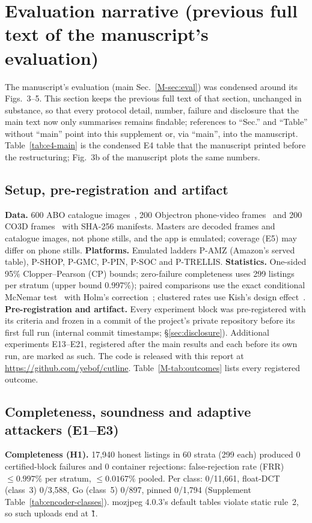 \documentclass[10pt]{article}
\newcommand{\mainref}[1]{\ref{M-#1}}
\newcommand{\repo}{\url{https://github.com/yebof/cutline}}
\begin{document}
\section{Evaluation narrative (previous full text of the manuscript's evaluation)}
\label{sec:evalnarrative}
The manuscript's evaluation (main Sec.~\mainref{sec:eval}) was condensed around its Figs.~3--5. This section keeps
the previous full text of that section, unchanged in substance, so that every protocol detail, number, failure and
disclosure that the main text now only summarises remains findable; references to ``Sec.'' and ``Table'' without
``main'' point into this supplement or, via ``main'', into the manuscript. Table~\ref{tab:e4-main} is the condensed E4
table that the manuscript printed before the restructuring; Fig.~3b of the manuscript plots the same numbers.


\subsection{Setup, pre-registration and artifact}
\textbf{Data.} 600 ABO catalogue images~\cite{collins2022abo}, 200 Objectron phone-video frames~\cite{ahmadyan2021objectron}
and 200 CO3D frames~\cite{reizenstein2021common} with SHA-256 manifests. Masters are decoded frames and catalogue images, not
phone stills, and the app is emulated; coverage (E5) may differ on phone stills.
\textbf{Platforms.} Emulated ladders P-AMZ (Amazon's served table), P-SHOP, P-GMC, P-PIN, P-SOC and P-TRELLIS.
\textbf{Statistics.} One-sided 95\% Clopper--Pearson (CP) bounds; zero-failure completeness uses 299 listings per
stratum (upper bound 0.997\%); paired comparisons use the exact conditional McNemar test~\cite{fagerland2013mcnemar}
with Holm's correction~\cite{aickin1996adjusting}; clustered rates use Kish's design effect~\cite{kish2005design}.
\textbf{Pre-registration and artifact.} Every experiment block was pre-registered with its criteria and frozen in a commit
of the project's private repository before its first full run (internal commit timestamps; \S\ref{sec:disclosure}). Additional experiments E13--E21, registered after the main results and each before its own run, are marked as
such. The code is released with this report at \repo{}. Table~\mainref{tab:outcomes} lists every registered outcome.


\subsection{Completeness, soundness and adaptive attackers (E1--E3)}
\textbf{Completeness (H1).} 17,940 honest listings in 60 strata (299 each) produced 0 certified-block failures and 0
container rejections: false-rejection rate (FRR) $\le0.997\%$ per stratum, $\le0.0167\%$ pooled. Per class:
\Ezero{} 0/11,661, float-DCT (class~3) 0/3,588, Go (class~5) 0/897, pinned \EP{} 0/1,794 (Supplement
Table~\ref{tab:encoder-classes}). mozjpeg 4.0.3's default tables violate static rule~2, so such uploads end at
\G{1}.
\end{document}
